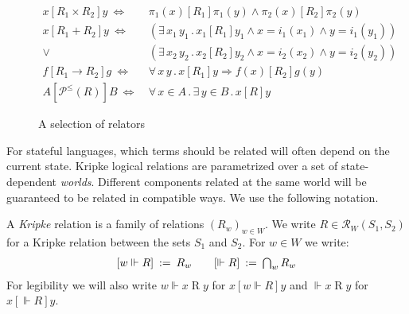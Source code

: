 \documentclass[acmsmall,authordraft]{acmart}
\newcommand{\ifr}[1]{\mathrel{[{#1}]}}
\begin{document}
\begin{figure} %
  \begin{align*}
    x \ifr{R_1 \times R_2} y \ \Leftrightarrow\  &
      \pi_1(x) \ifr{R_1} \pi_1(y) \wedge
      \pi_2(x) \ifr{R_2} \pi_2(y) \\
    x \ifr{R_1 + R_2} y \ \Leftrightarrow\  &
      (\exists \, x_1 \, y_1 \,.\,
        x_1 \ifr{R_1} y_1 \wedge
        x = i_1(x_1) \wedge
        y = i_1(y_1)) \\ \vee\ &
      (\exists \, x_2 \, y_2 \,.\,
        x_2 \ifr{R_2} y_2 \wedge
        x = i_2(x_2) \wedge
        y = i_2(y_2)) \\
    f \ifr{R_1 \rightarrow R_2} g \ \Leftrightarrow\  &
      \forall \, x \, y \,.\,
        x \ifr{R_1} y \Rightarrow
        f(x) \ifr{R_2} g(y) \\
    A \ifr{\mathcal{P}^\le(R)} B \ \Leftrightarrow\  &
      \forall \, x \in A \,.\,
      \exists \, y \in B \,.\,
      x \ifr{R} y
  \end{align*}
  \caption{A selection of relators}
  \label{fig:relators}
\end{figure}


For stateful languages,
which terms should be related
will often depend on the current state.
Kripke logical relations
are parametrized over a set of state-dependent \emph{worlds}.
Different components related at the same world
will be guaranteed to be related in compatible ways.
We use the following notation.

\begin{definition} \label{def:klr} %
A \emph{Kripke} relation is
a family of relations $(R_w)_{w \in W}$.
We write $R \in \mathcal{R}_W(S_1, S_2)$
for a Kripke relation between the sets $S_1$ and $S_2$.
For $w \in W$ we write:
\[
\begin{array}{c@{\qquad}c}
    [w \Vdash R] \: := \: R_w &
    [\Vdash R] \: := \: \bigcap_{w} R_w
\end{array}
\]
For legibility we will also write
$w \Vdash x \mathrel{R} y$ for $x \ifr{w \Vdash R} y$
and $\Vdash x \mathrel{R} y$ for $x \ifr{\Vdash R} y$.
\end{definition}
\end{document}
